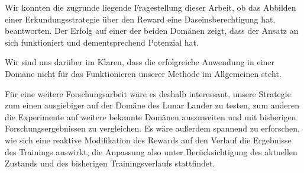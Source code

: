 Wir konnten die zugrunde liegende Fragestellung dieser Arbeit, ob das Abbilden einer Erkundungsstrategie über den Reward eine Daseinsberechtigung hat, beantworten. Der Erfolg auf einer der beiden Domänen zeigt, dass der Ansatz an sich funktioniert und dementsprechend Potenzial hat.

Wir sind uns darüber im Klaren, dass die erfolgreiche Anwendung in einer Domäne nicht für das Funktionieren unserer Methode im Allgemeinen steht. 

Für eine weitere Forschungsarbeit wäre es deshalb interessant, unsere Strategie zum einen ausgiebiger auf der Domäne des Lunar Lander zu testen, zum anderen die Experimente auf weitere bekannte Domänen auszuweiten und mit bisherigen Forschungsergebnissen zu vergleichen. Es wäre außerdem spannend zu erforschen, wie sich eine reaktive Modifikation des Rewards auf den Verlauf die Ergebnisse des Trainings auswirkt, die Anpassung also unter Berücksichtigung des aktuellen Zustands und des bisherigen Trainingsverlaufs stattfindet.